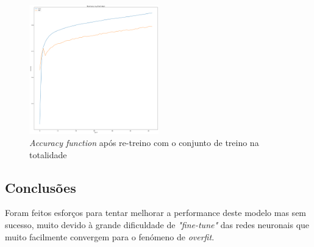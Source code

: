 \begin{figure}[t]
\begin{center}
\includegraphics[width=0.5\textwidth,keepaspectratio]{figures/last_retrain.png}
\caption{\textit{Accuracy function} após re-treino com o conjunto de treino na totalidade}
\label{diagram:accuracy_retrain_last}
\centering
\end{center}
\end{figure}

\subsection{Conclusões}
Foram feitos esforços para tentar melhorar a performance deste modelo mas sem sucesso, muito devido à grande dificuldade de \textit{"fine-tune"} das redes neuronais que muito facilmente convergem para o fenómeno de \textit{overfit}.
